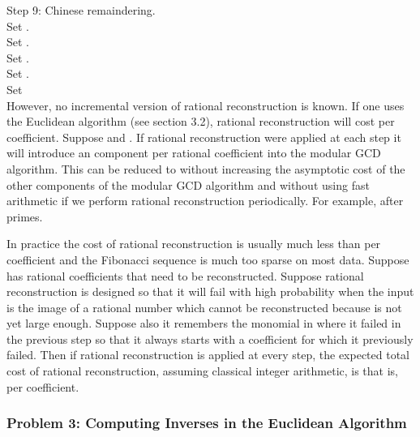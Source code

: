 \documentclass[10pt]{article}
\begin{document}
\medskip
\noindent
\hspace*{2mm}    Step 9: Chinese remaindering. \\
\hspace*{2mm}    Set .   \\  \hspace*{2mm}    Set . \\
\hspace*{2mm}    Set . \\
\hspace*{2mm}    Set . \\
\hspace*{2mm}    Set  \\

\noindent
However, no incremental version of rational reconstruction is known.
If one uses the Euclidean algorithm (see section 3.2), rational reconstruction will
cost  per coefficient.  Suppose  and .
If rational reconstruction were applied at each step it will
introduce an  component per rational coefficient
into the modular GCD algorithm.
This can be reduced to  without increasing
the asymptotic cost of the other components of the modular GCD
algorithm and without using fast arithmetic
if we perform rational reconstruction periodically.
For example, after   primes.

In practice the cost of rational reconstruction is
usually much less than  per coefficient and the
Fibonacci sequence is much too sparse on most data.
Suppose  has  rational coefficients that need to be
reconstructed. Suppose rational reconstruction is designed so that
it will fail with high probability when the input is the image of a
rational number which cannot be reconstructed because  is not yet
large enough. Suppose also it remembers the monomial in  where it
failed in the previous step so that it always starts with a
coefficient for which it previously failed. Then if rational
reconstruction is applied at every step, the expected total cost of
rational reconstruction, assuming classical integer arithmetic, is
 that is,  per coefficient.

\subsubsection*{Problem 3: Computing Inverses in the Euclidean Algorithm}
\end{document}
